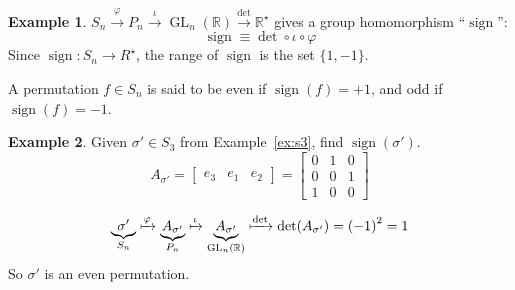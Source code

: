 \documentclass[12pt,letterpaper,DIV=11,final]{scrartcl}
\theoremstyle{plain}
\theoremstyle{definition}
\newtheorem{example}{Example}[section]
\theoremstyle{remark}
\DeclareMathOperator{\gl}{GL} %
\DeclareMathOperator{\sign}{sign}
\begin{document}
\begin{example}\label{ex:sign}
  $S_n \xrightarrow{\varphi} P_n \xrightarrow{\iota} \gl_n(\mathbb{R}) \xrightarrow{\det} \mathbb{R}^\star$ gives a group homomorphism \enquote{$\sign$}:
  \begin{displaymath}
    \sign \equiv \det \circ \iota \circ \varphi
  \end{displaymath}
  Since $\sign : S_n \to R^\star$, the range of $\sign$ is the set $\{ 1, -1 \}$.

  A permutation $f \in S_n$ is said to be even if $\sign(f) = +1$, and odd if $\sign(f) = -1$.
\end{example}

\begin{example}
  Given $\sigma' \in S_3$ from Example~\ref{ex:s3}, find $\sign(\sigma')$.
  \begin{displaymath}
    A_{\sigma'} = \begin{bmatrix}
      e_3 & e_1 & e_2
    \end{bmatrix} =
    \begin{bmatrix}
      0 & 1 & 0 \\
      0 & 0 & 1 \\
      1 & 0 & 0
    \end{bmatrix}
  \end{displaymath}

  \begin{displaymath}
    \underbrace{\sigma'}_{S_n} \xmapsto{\varphi} \underbrace{A_{\sigma'}}_{P_n} \xmapsto{\iota} \underbrace{A_{\sigma'}}_{\gl_n(\mathbb{R})} \xmapsto{\det} \det(A_{\sigma'}) = {(-1)}^2 = 1
  \end{displaymath}
  So $\sigma'$ is an even permutation.
\end{example}
\end{document}
